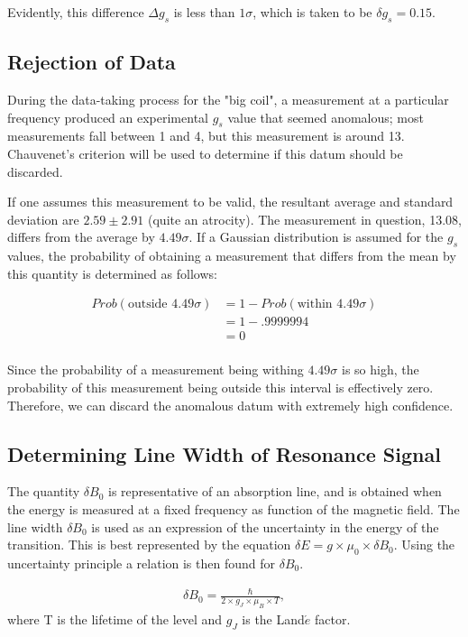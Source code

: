\documentclass[a4paper]{article}
\begin{document}
Evidently, this difference $\Delta g_s$ is less than $1 \sigma$, which is taken to be $\delta g_s = 0.15$.

\subsection{Rejection of Data}
\qq During the data-taking process for the "big coil", a measurement
at a particular frequency produced an experimental $g_s$ value that
seemed anomalous; most measurements fall between 1 and 4, but this
measurement is around 13. Chauvenet's criterion will be used to
determine if this datum should be discarded.

\qq If one assumes this measurement to be valid, the resultant average
and standard deviation are $2.59 \pm 2.91$ (quite an atrocity). The
measurement in question, 13.08, differs from the average by $4.49
\sigma$. If a Gaussian distribution is assumed for the $g_s$ values,
the probability of obtaining a measurement that differs from the mean
by this quantity is determined as follows:

\begin{align*}
Prob(\text{outside }  4.49 \sigma) &= 1 - Prob(\text{within } 4.49 \sigma) \\
							  &= 1 -  .9999994 \\
							  &= 0 \\
\end{align*}

\qq Since the probability of a measurement being withing $4.49 \sigma$
is so high, the probability of this measurement being outside this
interval is effectively zero. Therefore, we can discard the anomalous
datum with extremely high confidence.

\subsection{Determining Line Width of Resonance Signal}
\qq The quantity $\delta B_0$ is representative of an absorption line, and is
obtained when the energy is measured at a fixed frequency as function
of the magnetic field. The line width $\delta B_0$ is used as an
expression of the uncertainty in the energy of the transition. This is
best represented by the equation $\delta E = g \times \mu_0 \times
\delta B_0$. Using the uncertainty principle a relation is then found
for $\delta B_0$.

\begin{align*}
\delta B_0 = \frac{\hbar}{2 \times g_J \times \mu_B \times T},
\end{align*}
where T is the lifetime of the level and $g_J$ is the Land$\acute{e}$
factor.
\end{document}
